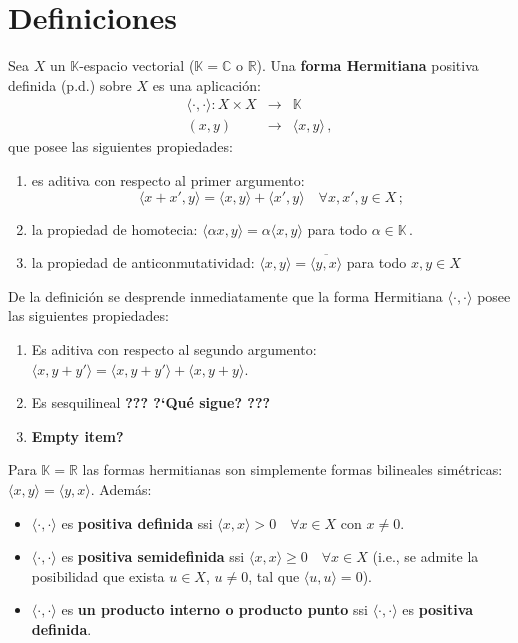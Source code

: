 
\section{Definiciones}\label{sec:def}

\begin{mydef}
Sea $X$ un $\mathbb{K}$-espacio vectorial
{\rm ($\mathbb{K}=\mathbb{C}$ o $\mathbb{R}$)}. 
Una \textbf{forma Hermitiana} positiva definida (p.d.) sobre $X$
es una aplicaci\'on:
\begin{eqnarray*}
\langle\cdot,\cdot\rangle: X\times X & \rightarrow & \mathbb{K} \\
(x,y) & \rightarrow & \langle x,y \rangle\,,
\end{eqnarray*}
que posee las siguientes propiedades:
\begin{enumerate}
\item
es aditiva con respecto al primer argumento:
$$
\langle x+x',y \rangle = \langle x,y \rangle + \langle x',y \rangle
\quad \forall x,x',y \in X\,;
$$
\item
la propiedad de homotecia:
$\langle\alpha x,y\rangle = \alpha\langle x,y\rangle$ 
para todo $\alpha\in\mathbb{K}$\,.
\item
la propiedad de anticonmutatividad:
$\langle x,y\rangle=\overline{\langle y,x\rangle}$
para todo $x,y\in X$
\end{enumerate}
\end{mydef}

\smallskip\noindent
De la definici\'on se desprende inmediatamente que la forma Hermitiana
$\langle\cdot,\cdot\rangle$ posee las siguientes propiedades:
\begin{enumerate}
\item
Es aditiva con respecto al segundo argumento:
$\langle x,y+y'\rangle = \langle x,y+y'\rangle+\langle x,y+y\rangle$.
\item
Es sesquilineal {\color{red}\bf ??? ?`Qu\'e sigue? ???}
\item
{\color{red}\bf Empty item?}
\end{enumerate}

\smallskip\noindent
Para $\mathbb{K}=\mathbb{R}$ las formas hermitianas son simplemente
formas bilineales sim\'etricas: 
$\langle x,y \rangle= \langle y,x \rangle$.
Adem\'as:
\begin{itemize}
\item
$\langle\cdot,\cdot\rangle$ es \textbf{positiva definida} ssi
$\langle x,x\rangle > 0\quad\forall x\in X$ con $x\neq0$.
\item
$\langle\cdot,\cdot\rangle$ es \textbf{positiva semidefinida} ssi
$\langle x,x\rangle\geq0\quad\forall x\in X$
(i.e., se admite la posibilidad que exista $u\in X$, $u\neq0$,
tal que $\langle u,u\rangle=0$).
\item
$\langle\cdot,\cdot \rangle$  es 
\textbf{un producto interno o producto punto} ssi 
$\langle\cdot,\cdot\rangle$ es \textbf{positiva definida}.
\end{itemize}

